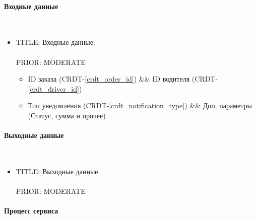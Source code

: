 	\paragraph{Входные данные} \mbox{} \\ \label{}

      \begin{itemize}

        \item{

          TITLE: Входные данные.\\
          \\
          PRIOR: MODERATE\\

        }

        \begin{itemize}
          \item ID заказа (CRDT-\ref{crdt_order_id}) \&\& ID водителя (CRDT-\ref{crdt_driver_id})
          \item Тип уведомления (CRDT-\ref{crdt_notification_type}) \&\& Доп. параметры (Статус, сумма и прочее)
        \end{itemize}

      \end{itemize}

    \paragraph{Выходные данные} \mbox{} \\

      \begin{itemize}

        \item{

          TITLE: Выходные данные.\\
          \\
          PRIOR: MODERATE\\

        }

      \end{itemize}

    \paragraph{Процесс сервиса} \mbox{} \\

